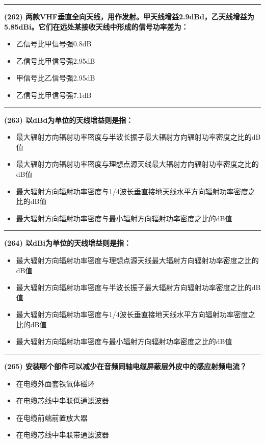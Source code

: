 \documentclass[twocolumn]{ctexart}  %
\begin{document}
\noindent\rule{0.5\textwidth}{1pt}
\heiti \textbf{(262) 两款VHF垂直全向天线，用作发射。甲天线增益2.9dBd，乙天线增益为5.85dBi。它们在远处某接收天线中形成的信号功率差为：} \songti {\color{gray} [LK0933] }
\begin{itemize}
	\item  乙信号比甲信号强0.8dB
	\item  乙信号比甲信号强2.95dB
	\item  甲信号比乙信号强2.95dB
	\item  乙信号比甲信号强7.1dB
\end{itemize}


\noindent\rule{0.5\textwidth}{1pt}
\heiti \textbf{(263) 以dBd为单位的天线增益则是指：} \songti {\color{gray} [LK1062] }
\begin{itemize}
	\item  最大辐射方向辐射功率密度与半波长振子最大辐射方向辐射功率密度之比的dB值
	\item  最大辐射方向辐射功率密度与理想点源天线最大辐射方向辐射功率密度之比的dB值
	\item  最大辐射方向辐射功率密度与1/4波长垂直接地天线水平方向辐射功率密度之比的dB值
	\item  最大辐射方向辐射功率密度与最小辐射方向辐射功率密度之比的dB值
\end{itemize}


\noindent\rule{0.5\textwidth}{1pt}
\heiti \textbf{(264) 以dBi为单位的天线增益则是指：} \songti {\color{gray} [LK1063] }
\begin{itemize}
	\item  最大辐射方向辐射功率密度与理想点源天线最大辐射方向辐射功率密度之比的dB值
	\item  最大辐射方向辐射功率密度与半波长振子最大辐射方向辐射功率密度之比的dB值
	\item  最大辐射方向辐射功率密度与1/4波长垂直接地天线水平方向辐射功率密度之比的dB值
	\item  最大辐射方向辐射功率密度与最小辐射方向辐射功率密度之比的dB值
\end{itemize}


\noindent\rule{0.5\textwidth}{1pt}
\heiti \textbf{(265) 安装哪个部件可以减少在音频同轴电缆屏蔽层外皮中的感应射频电流？} \songti {\color{gray} [LK1126] }
\begin{itemize}
	\item  在电缆外面套铁氧体磁环
	\item  在电缆芯线中串联低通滤波器
	\item  在电缆前端前置放大器
	\item  在电缆芯线中串联带通滤波器
\end{itemize}
\end{document}
